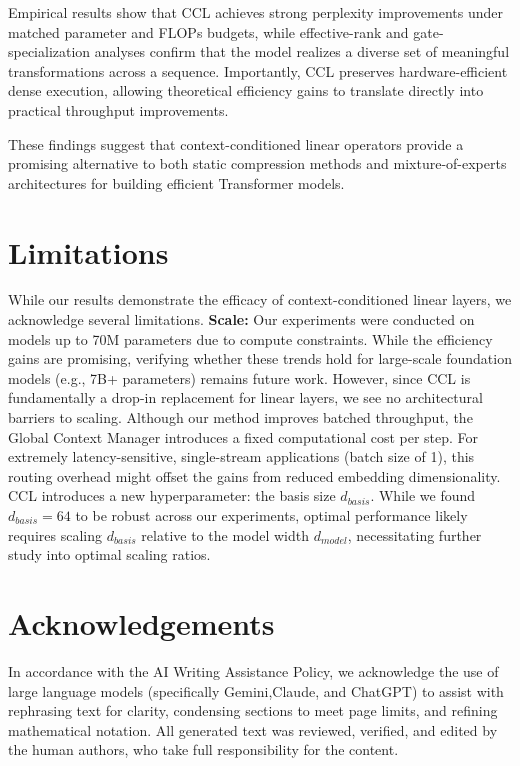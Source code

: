 \documentclass[11pt]{article}
\begin{document}
Empirical results show that CCL achieves strong perplexity improvements under matched parameter and FLOPs budgets, while effective-rank and gate-specialization analyses confirm that the model realizes a diverse set of meaningful transformations across a sequence. Importantly, CCL preserves hardware-efficient dense execution, allowing theoretical efficiency gains to translate directly into practical throughput improvements.

These findings suggest that context-conditioned linear operators provide a promising alternative to both static compression methods and mixture-of-experts architectures for building efficient Transformer models.


\section{Limitations} \label{sec:limitations} While our results demonstrate the efficacy of context-conditioned linear layers, we acknowledge several limitations. \textbf{Scale:} Our experiments were conducted on models up to 70M parameters due to compute constraints. While the efficiency gains are promising, verifying whether these trends hold for large-scale foundation models (e.g., 7B+ parameters) remains future work. However, since CCL is fundamentally a drop-in replacement for linear layers, we see no architectural barriers to scaling. Although our method improves batched throughput, the Global Context Manager introduces a fixed computational cost per step. For extremely latency-sensitive, single-stream applications (batch size of 1), this routing overhead might offset the gains from reduced embedding dimensionality.
CCL introduces a new hyperparameter: the basis size $d_{basis}$. While we found $d_{basis}=64$ to be robust across our experiments, optimal performance likely requires scaling $d_{basis}$ relative to the model width $d_{model}$, necessitating further study into optimal scaling ratios.

\section*{Acknowledgements}
In accordance with the AI Writing Assistance Policy, we acknowledge the use of large language models (specifically Gemini,Claude, and ChatGPT) to assist with rephrasing text for clarity, condensing sections to meet page limits, and refining mathematical notation. All generated text was reviewed, verified, and edited by the human authors, who take full responsibility for the content.
\end{document}
